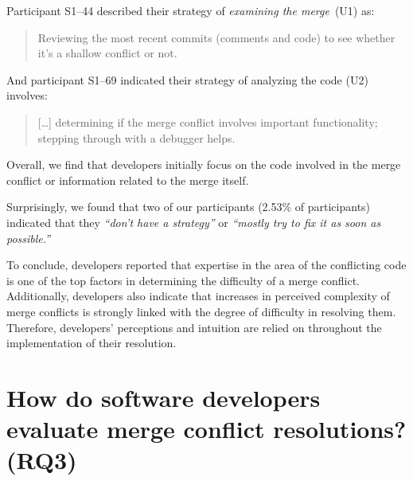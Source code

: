 Participant S1--44 described their strategy of \textit{examining the merge}~(U1) as:
\begin{quotation}
	Reviewing the most recent commits (comments and code) to see whether it's a shallow conflict or not.
\end{quotation}
	And participant S1--69 indicated their strategy of analyzing the code (U2) involves:
\begin{quotation}
[\ldots] determining if the merge conflict involves important functionality; stepping through with a debugger helps.
\end{quotation}
Overall, we find that developers initially focus on the code involved in the merge conflict or information related to the merge itself.

Surprisingly, we found that two of our participants (2.53\% of participants) indicated that they \textit{``don't have a strategy''} or \textit{``mostly try to fix it as soon as possible.''}


To conclude, developers reported that expertise in the area of the conflicting code is one of the top factors in determining the difficulty of a merge conflict.
Additionally, developers also indicate that increases in perceived complexity of merge conflicts is strongly linked with the degree of difficulty in resolving them.
Therefore, developers' perceptions and intuition are relied on throughout the implementation of their resolution.

\section{How do software developers \textbf{evaluate} merge conflict resolutions? (RQ3)}\label{RQ3}

